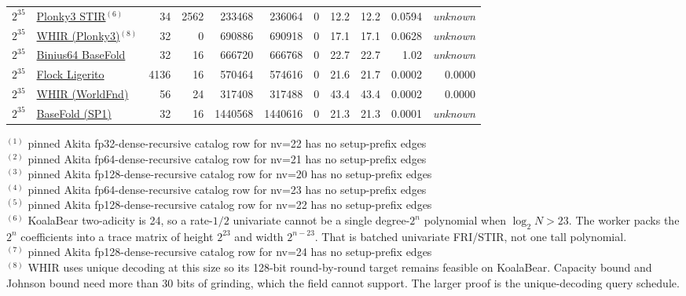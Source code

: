 \begin{table}[H]
\begin{tabular}{@{}llrrrrrrrrr@{}}
$2^{35}$ & \href{https://github.com/Plonky3/Plonky3/commit/3da160d09d1c6a878adaa5b339939fcdccda5d36}{Plonky3 STIR$^{(6)}$} & 34 & 2562 & 233468 & 236064 & 0 & 12.2 & 12.2 & 0.0594 & \textit{unknown} \\
$2^{35}$ & \href{https://github.com/Plonky3/Plonky3/commit/9d496524560f3c699473906c6f50fca7cf343730}{WHIR (Plonky3)$^{(8)}$} & 32 & 0 & 690886 & 690918 & 0 & 17.1 & 17.1 & 0.0628 & \textit{unknown} \\
$2^{35}$ & \href{https://github.com/binius-zk/binius64/commit/6e75a2d1d2e716578ae3ccb62806413fb1615176}{Binius64 BaseFold} & 32 & 16 & 666720 & 666768 & 0 & 22.7 & 22.7 & 1.02 & \textit{unknown} \\
$2^{35}$ & \href{https://github.com/succinctlabs/flock/commit/43f0eee06d887d87ad25d72614cbc2b17fe91430}{Flock Ligerito} & 4136 & 16 & 570464 & 574616 & 0 & 21.6 & 21.7 & 0.0002 & 0.0000 \\
$2^{35}$ & \href{https://github.com/worldfnd/whir/commit/8804e80e8e890d01bb585f2bd5e5b564ac0fd80d}{WHIR (WorldFnd)} & 56 & 24 & 317408 & 317488 & 0 & 43.4 & 43.4 & 0.0002 & 0.0000 \\
$2^{35}$ & \href{https://github.com/succinctlabs/sp1/commit/0f2a1e1389747ac0dbee1c4d40243eed20baba86}{BaseFold (SP1)} & 32 & 16 & 1440568 & 1440616 & 0 & 21.3 & 21.3 & 0.0001 & \textit{unknown} \\
\bottomrule
\end{tabular}
\smallskip
{\footnotesize
\noindent$^{(1)}$ pinned Akita fp32-dense-recursive catalog row for nv=22 has no setup-prefix edges\\
\noindent$^{(2)}$ pinned Akita fp64-dense-recursive catalog row for nv=21 has no setup-prefix edges\\
\noindent$^{(3)}$ pinned Akita fp128-dense-recursive catalog row for nv=20 has no setup-prefix edges\\
\noindent$^{(4)}$ pinned Akita fp64-dense-recursive catalog row for nv=23 has no setup-prefix edges\\
\noindent$^{(5)}$ pinned Akita fp128-dense-recursive catalog row for nv=22 has no setup-prefix edges\\
\noindent$^{(6)}$ KoalaBear two-adicity is 24, so a rate-$1/2$ univariate cannot be a single degree-$2^{n}$ polynomial when $\log_2 N>23$. The worker packs the $2^{n}$ coefficients into a trace matrix of height $2^{23}$ and width $2^{n-23}$. That is batched univariate FRI/STIR, not one tall polynomial.\\
\noindent$^{(7)}$ pinned Akita fp128-dense-recursive catalog row for nv=24 has no setup-prefix edges\\
\noindent$^{(8)}$ WHIR uses unique decoding at this size so its 128-bit round-by-round target remains feasible on KoalaBear. Capacity bound and Johnson bound need more than 30 bits of grinding, which the field cannot support. The larger proof is the unique-decoding query schedule.\\
}
\end{table}


